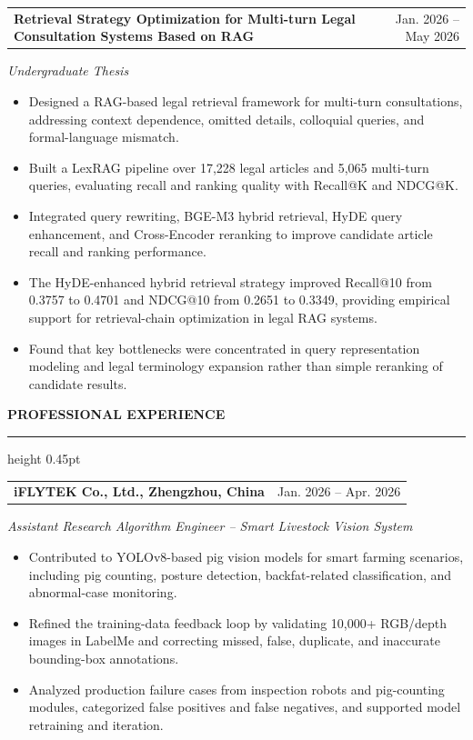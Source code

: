 \documentclass[10pt,a4paper]{article}
\makeatletter
\newcommand{\resumesection}[1]{%
  \par\vspace{6pt}%
  {\fontsize{12.8}{14}\selectfont\bfseries #1}\par
  \vspace{1pt}\hrule height 0.45pt\vspace{4pt}%
}
\newcommand{\datedheading}[2]{%
  \begin{tabular*}{\textwidth}{@{}p{0.79\textwidth}@{\extracolsep{\fill}}r@{}}
    \textbf{#1} & #2
  \end{tabular*}%
}
\newcommand{\roleline}[1]{%
  \vspace{0.5pt}\textit{#1}\par\vspace{0.5pt}%
}
\makeatother
\begin{document}
\vspace{3pt}
\datedheading{Retrieval Strategy Optimization for Multi-turn Legal Consultation Systems Based on RAG}{Jan. 2026 -- May 2026}
\roleline{Undergraduate Thesis}
\begin{itemize}
  \item Designed a RAG-based legal retrieval framework for multi-turn consultations, addressing context dependence, omitted details, colloquial queries, and formal-language mismatch.
  \item Built a LexRAG pipeline over 17,228 legal articles and 5,065 multi-turn queries, evaluating recall and ranking quality with Recall@K and NDCG@K.
  \item Integrated query rewriting, BGE-M3 hybrid retrieval, HyDE query enhancement, and Cross-Encoder reranking to improve candidate article recall and ranking performance.
  \item The HyDE-enhanced hybrid retrieval strategy improved Recall@10 from 0.3757 to 0.4701 and NDCG@10 from 0.2651 to 0.3349, providing empirical support for retrieval-chain optimization in legal RAG systems.
  \item Found that key bottlenecks were concentrated in query representation modeling and legal terminology expansion rather than simple reranking of candidate results.
\end{itemize}

\resumesection{PROFESSIONAL EXPERIENCE}
\datedheading{iFLYTEK Co., Ltd., Zhengzhou, China}{Jan. 2026 -- Apr. 2026}
\roleline{Assistant Research Algorithm Engineer -- Smart Livestock Vision System}
\begin{itemize}
  \item Contributed to YOLOv8-based pig vision models for smart farming scenarios, including pig counting, posture detection, backfat-related classification, and abnormal-case monitoring.
  \item Refined the training-data feedback loop by validating 10,000+ RGB/depth images in LabelMe and correcting missed, false, duplicate, and inaccurate bounding-box annotations.
  \item Analyzed production failure cases from inspection robots and pig-counting modules, categorized false positives and false negatives, and supported model retraining and iteration.
\end{itemize}
\end{document}
